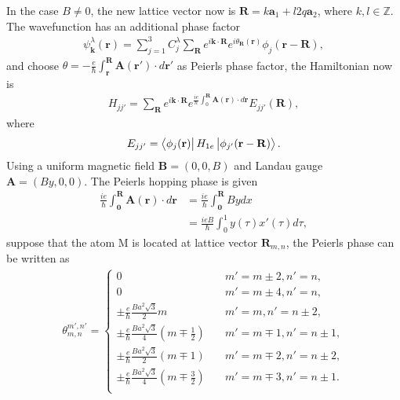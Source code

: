 \documentclass{article}
\begin{document}
In the case $B \neq 0$, the new lattice vector now is $\mathbf{R} = k \mathbf{a}_{1} + l 2q \mathbf{a}_{2}$, where $k,l \in \mathbb{Z}$. The wavefunction has an additional phase factor
\begin{gather}
	\psi_{\mathbf{k}}^{\lambda} (\mathbf{r}) = \sum_{j=1}^{3} C_{j}^{\lambda} \sum_{\mathbf{R}} e^{i \mathbf{k} \cdot \mathbf{R}} e^{i \theta_{\mathbf{R}} (\mathbf{r})} \phi_{j} (\mathbf{r} - \mathbf{R}),
\end{gather}
and choose $\theta = -\frac{e}{\hbar}\int_{\mathbf{r}}^{\mathbf{R}} \mathbf{A}(\mathbf{r}') \cdot d \mathbf{r}'$ as Peierls phase factor, the Hamiltonian now is
\begin{gather}
	H_{j  j' }^{} = \sum_{\mathbf{R}} e^{i \mathbf{k} \cdot \mathbf{R}} e^{\frac{ie}{\hbar} \int_{0}^{\mathbf{R}} \mathbf{A}(\mathbf{r}) \cdot d \mathbf{r}} E_{jj'} (\mathbf{R}),
\end{gather}
where 
\begin{gather}
	E_{jj'} = \bra{\phi_{j}(\mathbf{r})} H_{1e} \ket{\phi_{j'} (\mathbf{r} - \mathbf{R})}.
\end{gather}
Using a uniform magnetic field $\mathbf{B} = (0,0,B)$ and Landau gauge $\mathbf{A} = (By,0,0)$. The Peierls hopping phase is given
\begin{equation}
	\begin{aligned}
		\frac{ie}{\hbar} \int_{\mathbf{0}}^{\mathbf{R}} \mathbf{A}(\mathbf{r}) \cdot d \mathbf{r}& = \frac{ie}{\hbar} \int_{\mathbf{0}}^{\mathbf{R}} B y dx \\
		&= \frac{ieB}{\hbar} \int_{0}^{1} y(\tau) x'(\tau) d\tau,
	\end{aligned}
\end{equation}
suppose that the atom M is located at lattice vector $\mathbf{R}_{m,n}$, the Peierls phase can be written as
\begin{gather}
	\theta_{m,n}^{m',n'} =
	\begin{cases}
		0                                                                             & \quad m' = m \pm 2, n' = n  ,      \\
		0                                                                             & \quad m' = m \pm 4, n' = n  ,      \\
		\pm \frac{e}{\hbar} \frac{B a^{2} \sqrt{3}}{2} m                      & \quad m' = m , n' = n \pm 2,  \\
		\pm \frac{e}{\hbar} \frac{B a^{2} \sqrt{3}}{4} \left(m \mp \frac{1}{2}\right) & \quad m' = m \mp 1, n' = n \pm 1 , \\
		\pm \frac{e}{\hbar} \frac{B a^{2} \sqrt{3}}{2} (m \mp 1)                      & \quad m' = m \mp 2, n' = n \pm 2,  \\
		\pm \frac{e}{\hbar} \frac{B a^{2} \sqrt{3}}{4} \left(m \mp \frac{3}{2}\right) & \quad m' = m \mp 3, n' = n \pm 1.  \\
	\end{cases}
\end{gather}
\end{document}
